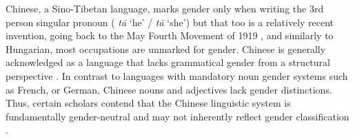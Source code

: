 \documentclass[runningheads]{llncs}
\newcommand{\zh}[1]{\simplifiedchinesefont{#1}\rmfamily}
\begin{document}
Chinese, a Sino-Tibetan language, marks gender only when writing the 3rd person singular pronoun (\zh{他} \textit{tā} `he' / \zh{她} \textit{tā} `she') but that too is a relatively recent invention, going back to the May Fourth Movement of 1919 \citep{bi_2013_tazi}, and similarly to Hungarian, most occupations are unmarked for gender.
Chinese is generally acknowledged as a language that lacks grammatical gender from a structural perspective \citep{li_1989_mandarin}. In contrast to languages with mandatory noun gender systems such as French, or German, Chinese nouns and adjectives lack gender distinctions. Thus, certain scholars contend that the Chinese linguistic system is fundamentally gender-neutral and may not inherently reflect gender classification \citep{li_1989_mandarin,packard_2000_morphology}.
\end{document}

